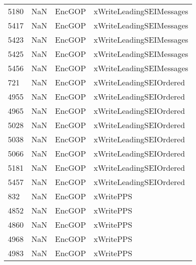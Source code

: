 \begin{tabular}{llll}
5180 &                   NaN &                     EncGOP &                  xWriteLeadingSEIMessages \\
5417 &                   NaN &                     EncGOP &                  xWriteLeadingSEIMessages \\
5423 &                   NaN &                     EncGOP &                  xWriteLeadingSEIMessages \\
5425 &                   NaN &                     EncGOP &                  xWriteLeadingSEIMessages \\
5456 &                   NaN &                     EncGOP &                  xWriteLeadingSEIMessages \\
721  &                   NaN &                     EncGOP &                   xWriteLeadingSEIOrdered \\
4955 &                   NaN &                     EncGOP &                   xWriteLeadingSEIOrdered \\
4965 &                   NaN &                     EncGOP &                   xWriteLeadingSEIOrdered \\
5028 &                   NaN &                     EncGOP &                   xWriteLeadingSEIOrdered \\
5038 &                   NaN &                     EncGOP &                   xWriteLeadingSEIOrdered \\
5066 &                   NaN &                     EncGOP &                   xWriteLeadingSEIOrdered \\
5181 &                   NaN &                     EncGOP &                   xWriteLeadingSEIOrdered \\
5457 &                   NaN &                     EncGOP &                   xWriteLeadingSEIOrdered \\
832  &                   NaN &                     EncGOP &                                 xWritePPS \\
4852 &                   NaN &                     EncGOP &                                 xWritePPS \\
4860 &                   NaN &                     EncGOP &                                 xWritePPS \\
4968 &                   NaN &                     EncGOP &                                 xWritePPS \\
4983 &                   NaN &                     EncGOP &                                 xWritePPS \\

\end{tabular}
